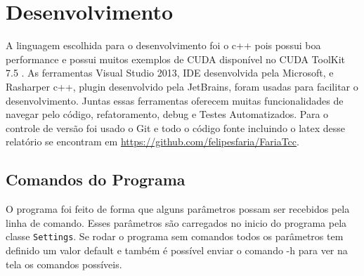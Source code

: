 \chapter{Desenvolvimento}\label{chp:LABEL_CHP_4}

A linguagem escolhida para o desenvolvimento foi o c++ pois possui boa performance e possui muitos exemplos de CUDA disponível no CUDA ToolKit 7.5 \cite{CUDA}. As ferramentas Visual Studio 2013, IDE desenvolvida pela Microsoft, e Rasharper c++, plugin desenvolvido pela JetBrains, foram usadas para facilitar o desenvolvimento. Juntas essas ferramentas oferecem muitas funcionalidades de navegar pelo código, refatoramento, debug e Testes Automatizados. Para o controle de versão foi usado o Git e todo o código fonte incluindo o latex desse relatório se encontram em \url{https://github.com/felipesfaria/FariaTcc}.

\section{Comandos do Programa}
O programa foi feito de forma que alguns parâmetros possam ser recebidos pela linha de comando. 
Esses parâmetros são carregados no inicio do programa pela classe \texttt{Settings}.
Se rodar o programa sem comandos todos os parâmetros tem definido um valor default e também é possível enviar o comando -h para ver na tela os comandos possíveis.


